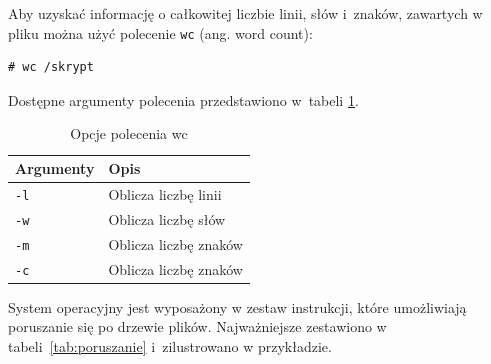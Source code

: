 \begin{example}\label{ex:wys} 

Aby uzyskać informację o całkowitej liczbie linii, słów i~znaków, zawartych w pliku można użyć polecenie \lstinline[style=MyBashStyle]{wc} (ang. word count): 

\begin{lstlisting}[style=MyBashStyle]
# wc /skrypt
\end{lstlisting}

Dostępne argumenty polecenia przedstawiono w~tabeli \ref{tab:opcjeWC}. 


\begin{table}[h!]
\centering
\caption{Opcje polecenia wc}
\setlength{\arrayrulewidth}{1pt}
\setlength{\tabcolsep}{6pt}
\renewcommand{\arraystretch}{1.2}
\begin{tabular}{ |p{}|p{}|}
\hline \rowcolor{gray}
\textbf{Argumenty} & \textbf{Opis} \\ \hline
\mbox{\lstinline[style=MyBashStyle]{-l}} & Oblicza liczbę linii \\ \hline
\mbox{\lstinline[style=MyBashStyle]{-w}} & Oblicza liczbę słów \\ \hline 
\mbox{\lstinline[style=MyBashStyle]{-m}} & Oblicza liczbę znaków \\ \hline
\mbox{\lstinline[style=MyBashStyle]{-c}} & Oblicza liczbę znaków  \\ \hline
\end{tabular}
\label{tab:opcjeWC}
\end{table}

\begin{example}

System operacyjny jest wyposażony w zestaw instrukcji, które umożliwiają poruszanie się po drzewie plików. Najważniejsze zestawiono w tabeli~\ref{tab:poruszanie} i~zilustrowano w przykładzie.


\end{example}
\end{example}
